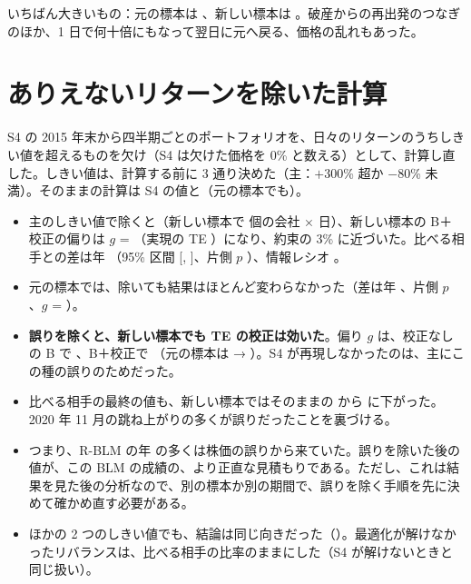 いちばん大きいもの：元の標本は 、新しい標本は 。破産からの再出発のつなぎのほか、1 日で何十倍にもなって翌日に元へ戻る、価格の乱れもあった。

\section{ありえないリターンを除いた計算}

S4 の 2015 年末から四半期ごとのポートフォリオを、日々のリターンのうちしきい値を超えるものを欠け（S4 は欠けた価格を 0\% と数える）として、計算し直した。しきい値は、計算する前に 3 通り決めた（主：$+$300\% 超か $-$80\% 未満）。そのままの計算は S4 の値と（元の標本でも）。

\begin{table}[H]
\centering\small
\caption{ありえない日々のリターンを除いた計算（2017 年以降、四半期ごと、ChronoGPT＋リッジ）。最終の値は 2015 年末を 1 とした 2026 年 9 月末の値}
\label{tab:explore}
\end{table}

\begin{keybox}[探索の結果]
\begin{itemize}
\item 主のしきい値で除くと（新しい標本で  個の会社 × 日）、新しい標本の B＋校正の偏りは $g$ = （実現の TE ）になり、約束の 3\% に近づいた。比べる相手との差は年 （95\% 区間 [, ]、片側 $p$ ）、情報レシオ 。
\item 元の標本では、除いても結果はほとんど変わらなかった（差は年 、片側 $p$ 、$g$ = ）。
\item \textbf{誤りを除くと、新しい標本でも TE の校正は効いた}。偏り $g$ は、校正なしの B で 、B＋校正で （元の標本は  → ）。S4 が再現しなかったのは、主にこの種の誤りのためだった。
\item 比べる相手の最終の値も、新しい標本ではそのままの  から  に下がった。2020 年 11 月の跳ね上がりの多くが誤りだったことを裏づける。
\item つまり、R-BLM の年  の多くは株価の誤りから来ていた。誤りを除いた後の値が、この BLM の成績の、より正直な見積もりである。ただし、これは結果を見た後の分析なので、別の標本か別の期間で、誤りを除く手順を先に決めて確かめ直す必要がある。
\item ほかの 2 つのしきい値でも、結論は同じ向きだった（）。最適化が解けなかったリバランスは、比べる相手の比率のままにした（S4 が解けないときと同じ扱い）。
\end{itemize}
\end{keybox}

